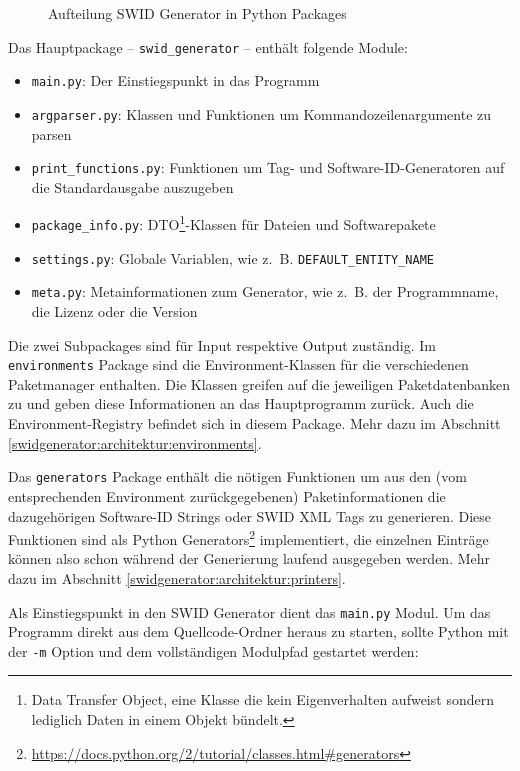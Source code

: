 \begin{figure}[H]
	\centering
	
	\caption{Aufteilung SWID Generator in Python Packages}
\end{figure}

Das Hauptpackage -- \texttt{swid\_generator} -- enthält folgende Module:

\begin{itemize}
	\item \texttt{main.py}: Der Einstiegspunkt in das Programm
	\item \texttt{argparser.py}: Klassen und Funktionen um
		Kommandozeilenargumente zu parsen
	\item \texttt{print\_functions.py}: Funktionen um Tag- und
		Software-ID-Generatoren auf die Standardausgabe auszugeben
	\item \texttt{package\_info.py}: DTO\footnote{Data Transfer Object, eine
		Klasse die kein Eigenverhalten aufweist sondern lediglich Daten in
		einem Objekt bündelt.}-Klassen für Dateien und Softwarepakete
	\item \texttt{settings.py}: Globale Variablen, wie z.\ B.
		\texttt{DEFAULT\_ENTITY\_NAME}
	\item \texttt{meta.py}: Metainformationen zum Generator, wie z.\ B. der
		Programmname, die Lizenz oder die Version
\end{itemize}

Die zwei Subpackages sind für Input respektive Output zuständig. Im
\texttt{environments} Package sind die Environment-Klassen für die verschiedenen
Paketmanager enthalten. Die Klassen greifen auf die jeweiligen Paketdatenbanken
zu und geben diese Informationen an das Hauptprogramm zurück. Auch die
Environment-Registry befindet sich in diesem Package. Mehr dazu im Abschnitt
\ref{swidgenerator:architektur:environments}.

Das \texttt{generators} Package enthält die nötigen Funktionen um aus den (vom
entsprechenden Environment zurückgegebenen) Paketinformationen die dazugehörigen
Software-ID Strings oder SWID XML Tags zu generieren. Diese Funktionen sind als
Python
Generators\footnote{\url{https://docs.python.org/2/tutorial/classes.html\#generators}}
implementiert, die einzelnen Einträge können also schon während der Generierung
laufend ausgegeben werden. Mehr dazu im Abschnitt
\ref{swidgenerator:architektur:printers}.

Als Einstiegspunkt in den SWID Generator dient das \texttt{main.py} Modul. Um
das Programm direkt aus dem Quellcode-Ordner heraus zu starten, sollte Python
mit der \texttt{-m} Option und dem vollständigen Modulpfad gestartet werden:

